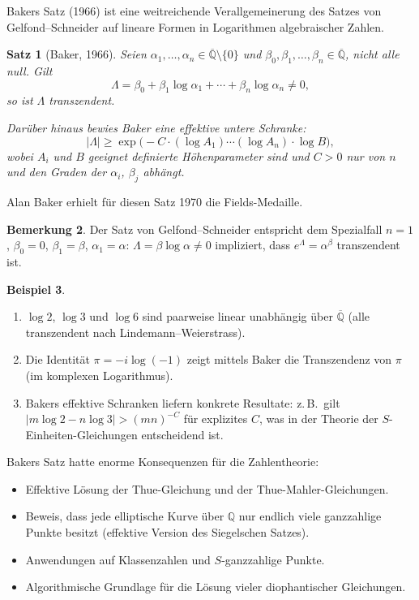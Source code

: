 \documentclass[12pt,a4paper]{amsart}
\newtheorem{theorem}{Satz}[section]
\theoremstyle{definition}
\newtheorem{beispiel}[theorem]{Beispiel}
\newtheorem{bemerkung}[theorem]{Bemerkung}
\begin{document}
Bakers Satz (1966) ist eine weitreichende Verallgemeinerung des Satzes von
Gelfond--Schneider auf lineare Formen in Logarithmen algebraischer Zahlen.

\begin{theorem}[Baker, 1966]
\label{satz:baker}
Seien $\alpha_1, \ldots, \alpha_n \in \overline{\mathbb{Q}} \setminus \{0\}$
und $\beta_0, \beta_1, \ldots, \beta_n \in \overline{\mathbb{Q}}$, nicht alle
null. Gilt
\[
  \Lambda = \beta_0 + \beta_1 \log \alpha_1 + \cdots + \beta_n \log \alpha_n \neq 0,
\]
so ist $\Lambda$ transzendent.

Darüber hinaus bewies Baker eine \emph{effektive untere Schranke}:
\[
  |\Lambda| \geq \exp\!\bigl(-C \cdot (\log A_1) \cdots (\log A_n) \cdot \log B\bigr),
\]
wobei $A_i$ und $B$ geeignet definierte Höhenparameter sind und $C > 0$ nur
von $n$ und den Graden der $\alpha_i$, $\beta_j$ abhängt.
\end{theorem}

Alan Baker erhielt für diesen Satz 1970 die Fields-Medaille.

\begin{bemerkung}
Der Satz von Gelfond--Schneider entspricht dem Spezialfall $n = 1$, $\beta_0 =
0$, $\beta_1 = \beta$, $\alpha_1 = \alpha$: $\Lambda = \beta \log \alpha \neq
0$ impliziert, dass $e^\Lambda = \alpha^\beta$ transzendent ist.
\end{bemerkung}

\begin{beispiel}
\begin{enumerate}[label=(\roman*)]
  \item $\log 2$, $\log 3$ und $\log 6$ sind paarweise linear unabhängig über
        $\overline{\mathbb{Q}}$ (alle transzendent nach Lindemann--Weierstrass).
  \item Die Identität $\pi = -i \log(-1)$ zeigt mittels Baker die Transzendenz
        von $\pi$ (im komplexen Logarithmus).
  \item Bakers effektive Schranken liefern konkrete Resultate: z.\,B.\ gilt
        $|m \log 2 - n \log 3| > (mn)^{-C}$ für explizites $C$, was in der
        Theorie der $S$-Einheiten-Gleichungen entscheidend ist.
\end{enumerate}
\end{beispiel}

Bakers Satz hatte enorme Konsequenzen für die Zahlentheorie:
\begin{itemize}[leftmargin=2em]
  \item Effektive Lösung der Thue-Gleichung und der Thue-Mahler-Gleichungen.
  \item Beweis, dass jede elliptische Kurve über $\mathbb{Q}$ nur endlich viele
        ganzzahlige Punkte besitzt (effektive Version des Siegelschen Satzes).
  \item Anwendungen auf Klassenzahlen und $S$-ganzzahlige Punkte.
  \item Algorithmische Grundlage für die Lösung vieler diophantischer Gleichungen.
\end{itemize}
\end{document}

